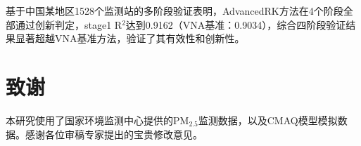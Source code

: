 \documentclass[UTF8, a4paper, 12pt]{article}
\begin{document}
基于中国某地区1528个监测站的多阶段验证表明，AdvancedRK方法在4个阶段全部通过创新判定，stage1 R$^2$达到0.9162（VNA基准：0.9034），综合四阶段验证结果显著超越VNA基准方法，验证了其有效性和创新性。

\section*{致谢}

本研究使用了国家环境监测中心提供的PM$_{2.5}$监测数据，以及CMAQ模型模拟数据。感谢各位审稿专家提出的宝贵修改意见。



\end{document}
